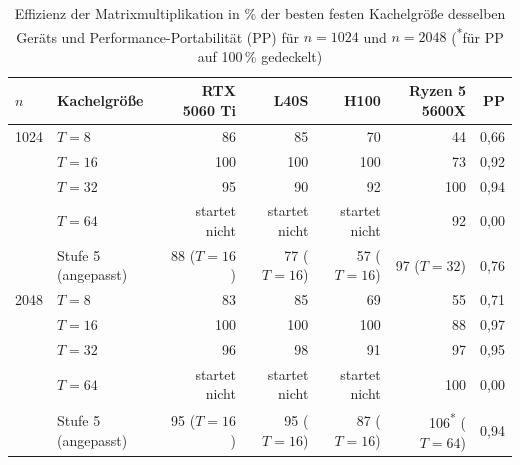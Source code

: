 \documentclass[12pt,a4paper]{article}
\begin{document}
\begin{table}[H]
\centering
\footnotesize
\setlength{\tabcolsep}{4.5pt}
\caption[Effizienz je Kachelgröße und Performance-Portabilität]{Effizienz der Matrixmultiplikation in \% der besten festen Kachelgröße desselben Geräts und Performance-Portabilität (PP) für $n = 1024$ und $n = 2048$ (\textsuperscript{*}für PP auf 100\,\% gedeckelt)}
\label{tab:kacheln}
\begin{tabular}{@{}llrrrrr@{}}
\toprule
$n$ & Kachelgröße & RTX 5060 Ti & L40S & H100 & Ryzen 5 5600X & PP \\
\midrule
1024 & $T = 8$  & 86  & 85  & 70  & 44  & 0,66 \\
     & $T = 16$ & 100 & 100 & 100 & 73  & 0,92 \\
     & $T = 32$ & 95  & 90  & 92  & 100 & 0,94 \\
     & $T = 64$ & startet nicht & startet nicht & startet nicht & 92 & 0,00 \\
     & Stufe 5 (angepasst) & 88 ($T{=}16$) & 77 ($T{=}16$) & 57 ($T{=}16$) & 97 ($T{=}32$) & 0,76 \\
\midrule
2048 & $T = 8$  & 83  & 85  & 69  & 55  & 0,71 \\
     & $T = 16$ & 100 & 100 & 100 & 88  & 0,97 \\
     & $T = 32$ & 96  & 98  & 91  & 97  & 0,95 \\
     & $T = 64$ & startet nicht & startet nicht & startet nicht & 100 & 0,00 \\
     & Stufe 5 (angepasst) & 95 ($T{=}16$) & 95 ($T{=}16$) & 87 ($T{=}16$) & 106\textsuperscript{*} ($T{=}64$) & 0,94 \\
\bottomrule
\end{tabular}
\end{table}
\end{document}
